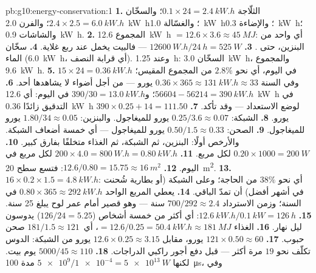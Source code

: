\begin{solution}{pb:g10:energy-conservation:1}
\textbf{1.} الثلّاجة $0.1 \times 24 = \qty{2.4}{kW.h}$؛ والسخّان
$2.4 \times 2.5 = \qty{6.0}{kW.h}$؛ والفرن \qty{2.0}{kW.h}؛ والغسّالة
\qty{1.0}{kW.h}؛ والإضاءة \qty{0.3}{kW.h}؛ والشاشات
\qty{0.9}{kW.h}.
\textbf{2.} المجموع \qty{12.6}{kW.h} $= 12.6 \times 3.6 \approx
\qty{45}{MJ}$: أي  واحد من البنزين، حتى .
\textbf{3.} $\qty{12600}{W.h}/\qty{24}{h} = \qty{525}{W}$ --- فالبيت
يخمل عند ربع غلاية.
\textbf{4.} سخّان الماء (\qty{6.0}{kW.h}، أي قرابة النصف). وعند
\qty{1.25}{h}: السخّان \qty{3.0}{kW.h}، والمجموع \qty{9.6}{kW.h}.
\textbf{5.} $15 \times 24 = \qty{0.36}{kW.h}$ في اليوم، أي نحو
$2.8\%$ من المجموع المقيس؛ وفي السنة $0.36 \times 365 \approx
\qty{131}{kW.h} \approx 33$ يورو --- من أجل أضواء لا يشاهدها أحد.
\textbf{6.} $56604 - 56214 = \qty{390}{kW.h}$؛
و$390/30 = \qty{13.0}{kW.h}$ في اليوم: أي \qty{12.6}{kW.h} في التدقيق
زائدًا \qty{0.36}{kW.h} لوضع الاستعداد --- وقد تأكد.
\textbf{7.} $390 \times 0.25 + 14 = 111.50$ يورو.
\textbf{8.} الشبكة: $0.25/3.6 \approx 0.07$ يورو للميغاجول.
والبنزين: $1.80/34 \approx 0.05$ يورو للميغاجول.
\textbf{9.} الصحن: $0.50/1.5 \approx 0.33$ يورو للميغاجول ---
أي خمسة أضعاف الشبكة. والأرخص أولًا: البنزين، ثم الشبكة، ثم الغذاء
متخلفًا بفارق كبير.
\textbf{10.} $0.20 \times 1000 = \qty{200}{W}$ لكل  مربع.
\textbf{11.} $200 \times 4.0 = \qty{800}{W.h} = \qty{0.80}{kW.h}$
لكل  مربع في اليوم.
\textbf{12.} $12.6/0.80 = 15.75 \approx \qty{16}{m^2}$: فتسع
سطح \qty{20}{m^2}.
\textbf{13.} $16 \times 0.2 \times 1.5 = \qty{4.8}{kW.h}$: أي نحو
$38\%$ من الحاجة؛ وعلى الشبكة (أو بطارية شُحنت في أشهر
أفضل) أن تمدّ الباقي.
\textbf{14.} يعطي  المربع الواحد $0.80 \times 365 \approx
\qty{292}{kW.h}$ في السنة؛ وزمن الاسترداد $700/292 \approx 2.4$ سنة ---
وهو قصير أمام عمر لوح يبلغ 25 سنة.
\textbf{15.} $\qty{12.6}{kW.h}/\qty{0.1}{kW} = \qty{126}{h}$:
أي أكثر من خمسة أشخاص ($126/24 = 5.25$) يدوسون ليل نهار.
\textbf{16.} الغذاء $= 12.6/0.25 = \qty{50.4}{kW.h} \approx
\qty{181}{MJ}$، أي\ $181/1.5 \approx 121$ صحن حبوب.
\textbf{17.} $121 \times 0.50 \approx 60$ يورو، مقابل
$12.6 \times 0.25 \approx 3.15$ يورو من الشبكة:  الدوس
تكلّف نحو $19$ مرة أكثر --- قبل دفع أجور راكبي الدراجات.
\textbf{18.} $5000/45 \approx 110$ يوم بيت. لكنها
$\num{5e9}/\num{1e-4} = \qty{5e13}{W}$ مدة \qty{100}{\micro s}، وفي

\end{solution}
